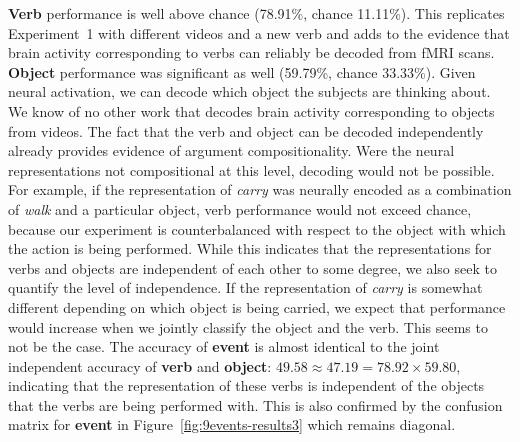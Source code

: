 \textbf{Verb} performance is well above chance (78.91\%, chance 11.11\%).
%
This replicates Experiment~1 with different videos and a new verb and adds to
the evidence that brain activity corresponding to verbs can reliably be decoded
from fMRI scans.
%
\textbf{Object} performance was significant as well (59.79\%, chance 33.33\%).
%
Given neural activation, we can decode which object the subjects are thinking
about.
%
We know of no other work that decodes brain activity corresponding to objects
from videos.
%
The fact that the verb and object can be decoded independently already provides
evidence of argument compositionality.
%
Were the neural representations not compositional at this level, decoding would
not be possible.
%
For example, if the representation of \emph{carry} was neurally encoded as a
combination of \emph{walk} and a particular object, verb performance would not
exceed chance, because our experiment is counterbalanced with respect to the
object with which the action is being performed.
%
While this indicates that the representations for verbs and objects are
independent of each other to some degree, we also seek to quantify the level of
independence.
%
If the representation of \emph{carry} is somewhat different depending on which
object is being carried, we expect that performance would increase when we
jointly classify the object and the verb.
%
This seems to not be the case.
%
The accuracy of \textbf{event} is almost identical to the joint
independent accuracy of \textbf{verb} and \textbf{object}:
$\text{49.58}\approx\text{47.19}=\text{78.92}\times\text{59.80}$,
indicating that the representation of these verbs is independent of
the objects that the verbs are being performed with.
%
This is also confirmed by the confusion matrix for \textbf{event} in
Figure~\ref{fig:9events-results3} which remains diagonal.

